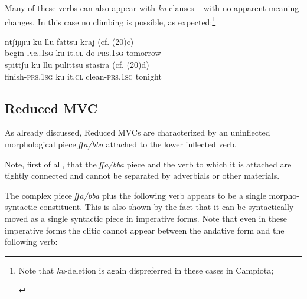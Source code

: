 \documentclass[output=paper]{langscibook}
\begin{document}
Many of these verbs can also appear with \textit{ku}-clauses -- with no apparent meaning changes. In this case no climbing is possible, as expected:\footnote{Note that \textit{ku}-deletion is again dispreferred in these cases in Campiota;

\ea \label{fn10ex}
    \z
\z
}

\ea \label{ac21}
    \ea \label{ac21a}\gll ntʃiɲɲu     ku  llu   fattsu     kraj  (cf. (20)c) \\
     begin-\textsc{prs}.\textsc{1sg}  ku  it.\textsc{cl} do-\textsc{prs}.\textsc{1sg}  tomorrow\\
    \ex \label{ac21b}\gll spittʃu      ku  llu   pulittsu     stasira (cf. (20)d) \\
     finish-\textsc{prs}.\textsc{1sg} ku it.\textsc{cl} clean-\textsc{prs}.\textsc{1sg}  tonight\\
    \z
\z


\subsection{Reduced MVC}

As already discussed, Reduced MVCs are characterized by an uninflected morphological piece \textit{ʃʃa/bba} attached to the lower inflected verb.

Note, first of all, that the \textit{ʃʃa/bba} piece and the verb to which it is attached are tightly connected and cannot be separated by adverbials or other materials.

\ea \label{ac22}
  \z
\z

The complex piece \textit{ʃʃa/bba} plus the following verb appears to be a single morpho-syntactic constituent.  This is also shown by the fact that it can be syntactically moved as a single syntactic piece in imperative forms. Note that even in these imperative forms the clitic cannot appear between the andative form and the following verb:
\end{document}
